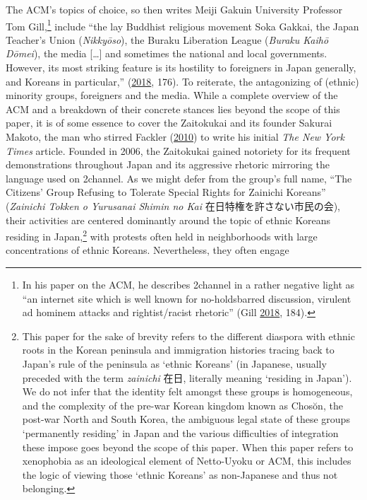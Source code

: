 \documentclass[10pt,british,A4paper,oneside]{memoir}
\begin{document}
The ACM's topics of choice, so then writes Meiji Gakuin University
Professor Tom Gill,\footnote{In his paper on the ACM, he describes
  2channel in a rather negative light as ``an internet site which is
  well known for no-holdsbarred discussion, virulent ad hominem attacks
  and rightist/racist rhetoric'' (Gill
  \protect\hyperlink{ref-gill_nativist_2018}{2018}, 184).} include ``the
lay Buddhist religious movement Soka Gakkai, the Japan Teacher's Union
(\emph{Nikkyōso}), the Buraku Liberation League (\emph{Buraku Kaihō
Dōmei}), the media {[}\ldots{}{]} and sometimes the national and local
governments. However, its most striking feature is its hostility to
foreigners in Japan generally, and Koreans in particular,''
(\protect\hyperlink{ref-gill_nativist_2018}{2018}, 176). To reiterate,
the antagonizing of (ethnic) minority groups, foreigners and the media.
While a complete overview of the ACM and a breakdown of their concrete
stances lies beyond the scope of this paper, it is of some essence to
cover the Zaitokukai and its founder Sakurai Makoto, the man who stirred
Fackler (\protect\hyperlink{ref-fackler_new_2010-1}{2010}) to write his
initial \emph{The New York Times} article. Founded in 2006, the
Zaitokukai gained notoriety for its frequent demonstrations throughout
Japan and its aggressive rhetoric mirroring the language used on
2channel. As we might defer from the group's full name, ``The Citizens'
Group Refusing to Tolerate Special Rights for Zainichi Koreans''
(\emph{Zainichi Tokken o Yurusanai Shimin no Kai}
在日特権を許さない市民の会), their activities are centered dominantly
around the topic of ethnic Koreans residing in Japan,\footnote{This
  paper for the sake of brevity refers to the different diaspora with
  ethnic roots in the Korean peninsula and immigration histories tracing
  back to Japan's rule of the peninsula as `ethnic Koreans' (in
  Japanese, usually preceded with the term \emph{zainichi} 在日,
  literally meaning `residing in Japan'). We do not infer that the
  identity felt amongst these groups is homogeneous, and the complexity
  of the pre-war Korean kingdom known as Chosŏn, the post-war North and
  South Korea, the ambiguous legal state of these groups `permanently
  residing' in Japan and the various difficulties of integration these
  impose goes beyond the scope of this paper. When this paper refers to
  xenophobia as an ideological element of Netto-Uyoku or ACM, this
  includes the logic of viewing those `ethnic Koreans' as non-Japanese
  and thus not belonging.} with protests often held in neighborhoods with
large concentrations of ethnic Koreans. Nevertheless, they often engage
\end{document}
